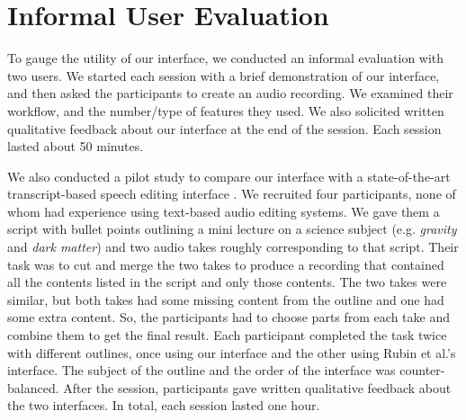 \section{Informal User Evaluation}
To gauge the utility of our interface, we conducted an informal evaluation with two users. We started each session with a brief demonstration of our interface, and then asked the participants to create an audio recording. We examined their workflow, and the number/type of features they used. We also solicited written qualitative feedback about our interface at the end of the session. Each session lasted about 50 minutes.


We also conducted a pilot study to compare our interface with a state-of-the-art transcript-based speech editing interface \cite{rubin2013content}. We recruited four participants, none of whom had experience using text-based audio editing systems. We gave them a script with bullet points outlining a mini lecture on a science subject (e.g. \textit{gravity} and \textit{dark matter}) and two audio takes roughly corresponding to that script. Their task was to cut and merge the two takes to produce a recording that contained all the contents listed in the script and only those contents. The two takes were similar, but both takes had some
missing content from the outline and one had some extra
content. So, the participants had to choose parts from each take and combine them to get the final result. Each participant completed the task twice with different outlines, once using our interface and the other using Rubin et al.'s interface. The subject of the outline and the order of the interface was counter-balanced. After the session, participants gave written qualitative feedback about the two interfaces. In total, each session lasted one hour.   
 

